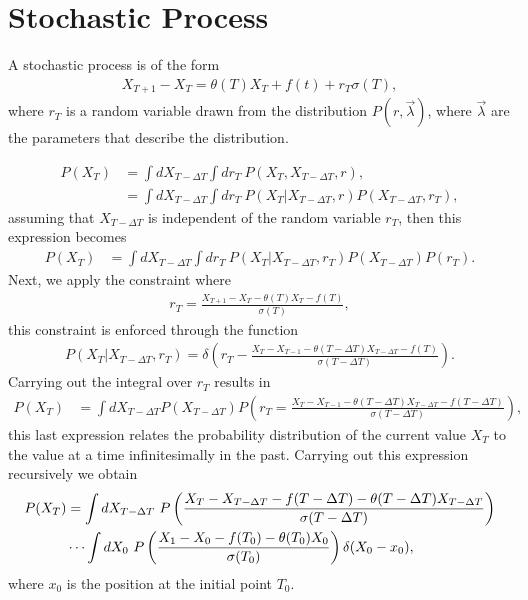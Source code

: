 \documentclass[10pt,a4paper]{article}
\begin{document}
\section{Stochastic Process}
A stochastic process is of the form
\begin{align}
X_{T+1}-X_{T} = \theta(T) X_{T} +f(t) +r_{T} \sigma(T),
\end{align}
where $r_T$ is a random variable drawn from the distribution $P(r,\vec{\lambda})$, where $\vec{\lambda}$ are the parameters that describe the distribution.


\begin{align}
P(X_T) &=  \int dX_{T-\Delta T}  \int dr_T \ P(X_T,X_{T-\Delta T},r), \\
 &=  \int dX_{T-\Delta T}  \int dr_T \ P(X_T|X_{T-\Delta T},r)P(X_{T-\Delta T},r_T),
\end{align}
assuming that $X_{T-\Delta T}$ is independent of the random variable $r_T$, then this expression becomes
\begin{align}
P(X_T) &= \int dX_{T-\Delta T}  \int dr_T \ P(X_T|X_{T-\Delta T},r_T)P(X_{T-\Delta T})P(r_T) .
\end{align}
Next, we apply the constraint where 
\begin{align}
r_{T} = \frac{X_{T+1}-X_T -\theta(T) X_{T}-f(T) }{\sigma(T)},
\end{align}
this constraint is enforced through the function 
\begin{align}
P(X_T|X_{T-\Delta T},r_T) = \delta\left(r_{T} -\frac{X_{T}-X_{T-1} -\theta(T-\Delta T) X_{T-\Delta T}-f(T) }{\sigma(T-\Delta T)} \right).
\end{align}
Carrying out the integral over $r_T$ results in
\begin{align}
P(X_T)  &=  \int dX_{T-\Delta T} P(X_{T-\Delta T})P\left(r_T = \frac{X_{T}-X_{T-1} -\theta(T-\Delta T) X_{T-\Delta T}-f(T-\Delta T) }{\sigma(T-\Delta T)}\right),
\end{align}
this last expression relates the probability distribution of the current value $X_T$ to the value at a time infinitesimally in the past. Carrying out this expression recursively we obtain
\begin{align}
P(X_T)  &=  \int dX_{T-\Delta T}  \ P\left(\frac{X_{T}-X_{T-\Delta T}-f(T-\Delta T) -\theta(T-\Delta T) X_{T-\Delta T} }{\sigma(T-\Delta T)}\right)  \notag\\
& \cdots \int dX_{0} \ P\left(\frac{X_{1}-X_{0}-f(T_0) -\theta(T_0) X_{0} }{\sigma(T_0)}\right)\delta(X_0 -x_0),
\end{align}
where $x_0$ is the position at the initial point $T_0$.\\
\end{document}
